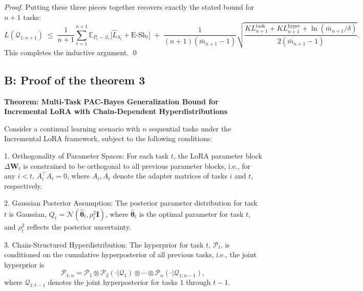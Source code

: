 \documentclass[letterpaper]{article} %
\begin{document}
\begin{proof}
Putting these three pieces together recovers exactly the stated bound for \(n+1\) tasks:
\[
L(\mathcal Q_{1:n+1})
\;\le\;
\frac{1}{n+1}
\sum_{t=1}^{n+1}\mathbb{E}_{P_t\sim\mathcal Q_t}\bigl[\widehat L_{S_t}+\mathrm{E\text{-}Sh}_t\bigr]
\;+\;
\frac{1}{(n+1)(\bar m_{n+1}-1)}
\sqrt{\frac{KL^{\mathrm{task}}_{n+1}+KL^{\mathrm{hyper}}_{n+1}+\ln(\bar m_{n+1}/\delta)}{2(\bar m_{n+1}-1)}}.
\]
This completes the inductive argument.  \qed



\end{proof}




\subsection{B: Proof of the theorem 3}
\textbf{Theorem: Multi-Task PAC-Bayes Generalization Bound for Incremental LoRA with Chain-Dependent Hyperdistributions}


Consider a continual learning scenario with $n$ sequential tasks under the Incremental LoRA framework, subject to the following conditions:

1. Orthogonality of Parameter Spaces: For each task $t$, the LoRA parameter block $\Delta\mathbf{W}_t$ is constrained to be orthogonal to all previous parameter blocks, i.e., for any $i < t$, $A_i^\top A_t = 0$, where $A_i, A_t$ denote the adapter matrices of tasks $i$ and $t$, respectively.

2. Gaussian Posterior Assumption: The posterior parameter distribution for task $t$ is Gaussian, $Q_t = \mathcal{N}(\hat{\boldsymbol{\theta}}_t, \rho_t^2 \mathbf{I})$, where $\hat{\boldsymbol{\theta}}_t$ is the optimal parameter for task $t$, and $\rho_t^2$ reflects the posterior uncertainty.

3. Chain-Structured Hyperdistribution: The hyperprior for task $t$, $\mathcal{P}_t$, is conditioned on the cumulative hyperposterior of all previous tasks, i.e., the joint hyperprior is
   $$
   \mathcal{P}_{1:n} = \mathcal{P}_1 \otimes \mathcal{P}_2(\cdot|\mathcal{Q}_1) \otimes \cdots \otimes \mathcal{P}_n(\cdot|\mathcal{Q}_{1:n-1}),
   $$ where $\mathcal{Q}_{1:t-1}$ denotes the joint hyperposterior for tasks $1$ through $t-1$.
\end{document}
